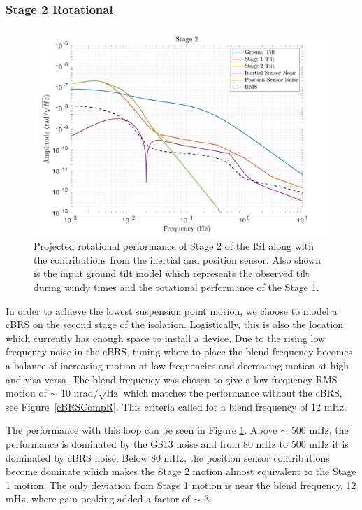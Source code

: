 \documentclass [12pt, proquest]{uwthesis}[2019]
\begin{document}
\subsubsection{Stage 2 Rotational}


\begin{figure}[!h]
\begin{center}
\includegraphics[width=\textwidth]{cBRS_Model_ST2RX.pdf}
\caption[Projected rotational performance of Stage 2 of the ISI]{Projected rotational performance of Stage 2 of the ISI along with the contributions from the inertial and position sensor. Also shown is the input ground tilt model which represents the observed tilt during windy times and the rotational performance of the Stage 1.}
\label{cBRS2R}
\end{center}
\end{figure}

In order to achieve the lowest suspension point motion, we choose to model a cBRS on the second stage of the isolation. Logistically, this is also the location which currently has enough space to install a device. Due to the rising low frequency noise in the cBRS, tuning where to place the blend frequency becomes a balance of increasing motion at low frequencies and decreasing motion at high and visa versa. The blend frequency was chosen to give a low frequency RMS motion of $\sim$ 10 nrad$/\sqrt{\text{Hz}}$ which matches the performance without the cBRS, see Figure~\ref{cBRSCompR}. This criteria called for a blend frequency of 12 mHz.

The performance with this loop can be seen in Figure \ref{cBRS2R}. Above $\sim$ 500 mHz, the performance is dominated by the GS13 noise and from 80 mHz to 500 mHz it is dominated by cBRS noise. Below 80 mHz, the position sensor contributions become dominate which makes the Stage 2 motion almost equivalent to the Stage 1 motion. The only deviation from Stage 1 motion is near the blend frequency, 12 mHz, where gain peaking added a factor of $\sim$ 3. 
\end{document}
